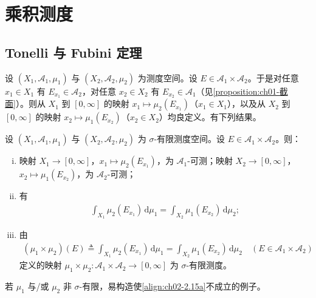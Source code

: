 \documentclass[../../main.tex]{subfiles}%
\begin{document}
\section{乘积测度}\label{section:ch02-乘积测度}

\subsection{Tonelli 与 Fubini 定理}\label{subsection:ch02-TonelliFubini}

设 $(X_1,\mathscr A_1,\mu_1)$ 与 $(X_2,\mathscr A_2,\mu_2)$ 为测度空间。设 $E\in\mathscr A_1\times\mathscr A_2$。于是对任意 $x_1\in X_1$ 有 $E_{x_1}\in\mathscr A_2$，对任意 $x_2\in X_2$ 有 $E_{x_2}\in\mathscr A_1$（见\cref{proposition:ch01-截面}）。则从 $X_1$ 到 $[0,\infty]$ 的映射 $x_1\mapsto\mu_2(E_{x_1})$（$x_1\in X_1$），以及从 $X_2$ 到 $[0,\infty]$ 的映射 $x_2\mapsto\mu_1(E_{x_2})$（$x_2\in X_2$）均良定义。有下列结果。

\begin{proposition}\label{proposition:ch02-乘积截面积分}
设 $(X_1,\mathscr A_1,\mu_1)$ 与 $(X_2,\mathscr A_2,\mu_2)$ 为 $\sigma$-有限测度空间。设 $E\in\mathscr A_1\times\mathscr A_2$。则：
\begin{enumerate}[(i)]
\item 映射 $X_1\to[0,\infty]$，$x_1\mapsto\mu_2(E_{x_1})$，为 $\mathscr A_1$-可测；映射 $X_2\to[0,\infty]$，$x_2\mapsto\mu_1(E_{x_2})$，为 $\mathscr A_2$-可测；
\item 有
\begin{align}
\int_{X_1}\mu_2(E_{x_1})\,\mathrm{d}\mu_1=\int_{X_2}\mu_1(E_{x_2})\,\mathrm{d}\mu_2; \label{align:ch02-2.15a}
\end{align}
\item 由
\begin{align}
(\mu_1\times\mu_2)(E)\triangleq \int_{X_1}\mu_2(E_{x_1})\,\mathrm{d}\mu_1=\int_{X_2}\mu_1(E_{x_2})\,\mathrm{d}\mu_2\quad(E\in\mathscr A_1\times\mathscr A_2) \label{align:ch02-2.15b}
\end{align}
定义的映射 $\mu_1\times\mu_2:\mathscr A_1\times\mathscr A_2\to[0,\infty]$ 为 $\sigma$-有限测度。
\end{enumerate}
\end{proposition}

\begin{remark}\label{remark:ch02-sigma有限必要}
若 $\mu_1$ 与/或 $\mu_2$ 非 $\sigma$-有限，易构造使\eqref{align:ch02-2.15a}不成立的例子。
\end{remark}
\end{document}
